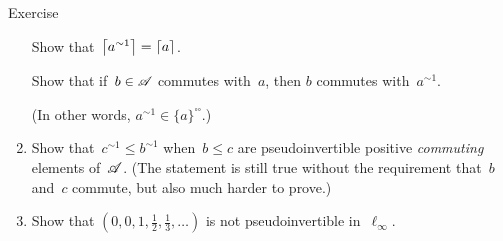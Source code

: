 \documentclass[a]{subfiles}
\begin{document}
\begin{parsec}
\begin{point}{Exercise}
\begin{enumerate}
Show that~$\left\lceil a^{\sim1}\right\rceil=\left\lceil a\right\rceil$.

Show that if~$b\in \mathscr{A}$ commutes with~$a$,
then $b$ commutes with~$a^{\sim 1}$.

(In other words, $a^{\sim1}\in\{a\}^{\square\square}$.)
\item
Show that~$c^{\sim1}\leq b^{\sim1}$
when~$b\leq c$ are pseudoinvertible positive \emph{commuting}
elements of~$\mathscr{A}$.
(The statement is still true without
the requirement that~$b$ and~$c$ commute,
but also much harder to prove.)


\item
Show that $(0,0,1,\frac{1}{2}, \frac{1}{3},\dotsc)$
is not pseudoinvertible in~$\ell_\infty$.
\end{enumerate}
\end{point}
\end{parsec}
\end{document}
